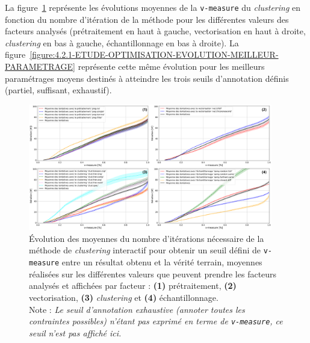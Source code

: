 		
			La figure~\ref{figure:4.2.1-ETUDE-OPTIMISATION-EVOLUTION-PAR-FACTEURS} représente les évolutions moyennes de la \texttt{v-measure} du \textit{clustering} en fonction du nombre d'itération de la méthode pour les différentes valeurs des facteurs analysés (prétraitement en haut à gauche, vectorisation en haut à droite, \textit{clustering} en bas à gauche, échantillonnage en bas à droite).
			La figure~\ref{figure:4.2.1-ETUDE-OPTIMISATION-EVOLUTION-MEILLEUR-PARAMETRAGE} représente cette même évolution pour les meilleurs paramétrages moyens destinés à atteindre les trois seuils d'annotation définis (partiel, suffisant, exhaustif).
			\begin{figure}[!htb]
				\centering
				\includegraphics[width=0.95\textwidth]{figures/etude-efficience-evolution-moyenne-par-vmeasure-par-facteur}
				\caption{Évolution des moyennes du nombre d'itérations nécessaire de la méthode de \textit{clustering} interactif pour obtenir un seuil défini de \texttt{v-measure} entre un résultat obtenu et la vérité terrain, moyennes réalisées sur les différentes valeurs que peuvent prendre les facteurs analysés et affichées par facteur : \textbf{(1)} prétraitement, \textbf{(2)} vectorisation, \textbf{(3)} \textit{clustering} et \textbf{(4)} échantillonnage. \\
				Note : \textit{Le seuil d'annotation exhaustive (annoter toutes les contraintes possibles) n'étant pas exprimé en terme de \texttt{v-measure}, ce seuil n'est pas affiché ici.}}
				\label{figure:4.2.1-ETUDE-OPTIMISATION-EVOLUTION-PAR-FACTEURS}
			\end{figure}
